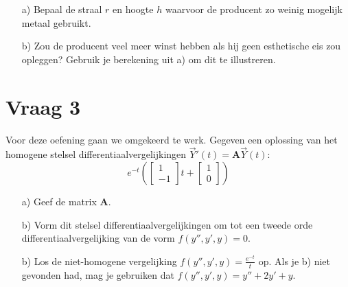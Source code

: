 \documentclass[kulak]{kulakarticle} %
\begin{document}
\begin{enumerate}
	\item[a)] Bepaal de straal \(r\) en hoogte \(h\) waarvoor de producent zo weinig mogelijk metaal gebruikt.
	\item[b)] Zou de producent veel meer winst hebben als hij geen esthetische eis zou opleggen? Gebruik je berekening uit a) om dit te illustreren.
\end{enumerate}

\newpage

\section*{Vraag 3}

Voor deze oefening gaan we omgekeerd te werk. Gegeven een oplossing van het homogene stelsel differentiaalvergelijkingen \(\vec{Y}'(t)=\textbf{A}\vec{Y}(t)\):
\[e^{-t}\left( \left[\begin{matrix}
	1\\
	-1
\end{matrix}\right]t + \left[ \begin{matrix}
1 \\
0
\end{matrix} \right] \right)\]

\begin{enumerate}
	\item[a)] Geef de matrix \(\textbf{A}\).
	\item[b)] Vorm dit stelsel differentiaalvergelijkingen om tot een tweede orde differentiaalvergelijking van de vorm \(f(y'',y',y)=0\).
	\item[b)] Los de niet-homogene vergelijking \(f(y'',y',y)=\frac{e^{-t}}{t}\) op. Als je b) niet gevonden had, mag je gebruiken dat \(f(y'',y',y)=y''+2y'+y\).
\end{enumerate}
\end{document}
